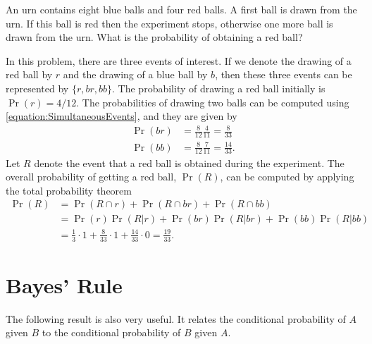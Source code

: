 \begin{example}
An urn contains eight blue balls and four red balls.
A first ball is drawn from the urn.
If this ball is red then the experiment stops, otherwise one more ball is drawn from the urn.
What is the probability of obtaining a red ball?

In this problem, there are three events of interest.
If we denote the drawing of a red ball by $r$ and the drawing of a blue ball by $b$, then these three events can be represented by $\{ r, br, bb \}$.
The probability of drawing a red ball initially is $\Pr (r) = 4/12$.
The probabilities of drawing two balls can be computed using \eqref{equation:SimultaneousEvents}, and they are given by
\begin{align*}
\Pr (br) &= \frac{8}{12} \frac{4}{11} = \frac{8}{33} \\
\Pr (bb) &= \frac{8}{12} \frac{7}{11} = \frac{14}{33} .
\end{align*}
Let $R$ denote the event that a red ball is obtained during the experiment.
The overall probability of getting a red ball, $\Pr (R)$, can be computed by applying the total probability theorem
\begin{equation*}
\begin{split}
\Pr (R) &= \Pr (R \cap r) + \Pr (R \cap br) + \Pr (R \cap bb) \\
&= \Pr(r) \Pr (R|r) + \Pr(br) \Pr (R|br) + \Pr(bb) \Pr (R|bb) \\
&= \frac{1}{3} \cdot 1 + \frac{8}{33} \cdot 1 + \frac{14}{33} \cdot 0
= \frac{19}{33} .
\end{split}
\end{equation*}
\end{example}


\section{Bayes' Rule}

The following result is also very useful.
It relates the conditional probability of $A$ given $B$ to the conditional probability of $B$ given $A$.

